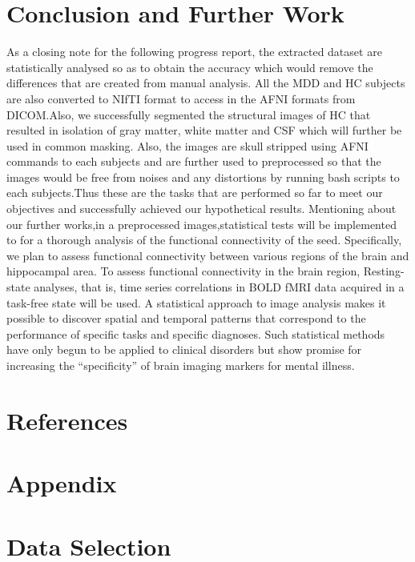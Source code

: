 \documentclass[12pt]{article}
\begin{document}
\section{Conclusion and Further Work}

As a closing note for the following progress report, the extracted
dataset are statistically analysed so as to obtain the accuracy which
would remove the differences that are created from manual analysis.
All the MDD and HC subjects are also converted to NIfTI format to
access in the AFNI formats from DICOM.Also, we successfully segmented
the structural images of HC that resulted in isolation of gray matter,
white matter and CSF which will further be used in common masking.
Also, the images are skull stripped using AFNI commands to each
subjects and are further used to preprocessed so that the images would
be free from noises and any distortions by running bash scripts to
each subjects.Thus these are the tasks that are performed so far to
meet our objectives and successfully achieved our hypothetical
results. Mentioning about our further works,in a preprocessed
images,statistical tests will be implemented to for a thorough
analysis of the functional connectivity of the seed. Specifically, we
plan to assess functional connectivity between various regions of the
brain and hippocampal area. To assess functional connectivity in the
brain region, Resting-state analyses, that is, time series
correlations in BOLD fMRI data acquired in a task-free state will be
used. A statistical approach to image analysis makes it possible to
discover spatial and temporal patterns that correspond to the
performance of specific tasks and specific diagnoses. Such statistical
methods have only begun to be applied to clinical disorders but show
promise for increasing the ``specificity'' of brain imaging markers
for mental illness.

\newpage
\section*{References}
\printbibliography[heading=none]

\newpage
\section*{Appendix}

\appendix

\section{Data Selection}
\end{document}
